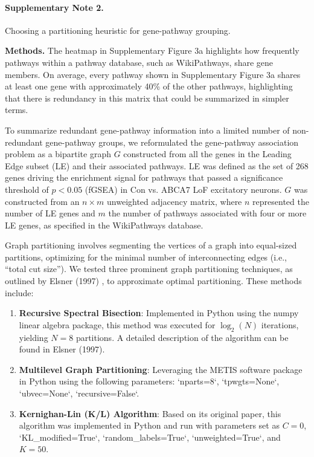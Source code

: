 \paragraph*{Supplementary Note 2.}
{}
Choosing a partitioning heuristic for gene-pathway grouping.

\textbf{Methods.}\newline
The heatmap in Supplementary Figure 3a highlights how frequently pathways within a pathway database, such as WikiPathways, share gene members. On average, every pathway shown in Supplementary Figure 3a shares at least one gene with approximately 40\% of the other pathways, highlighting that there is redundancy in this matrix that could be summarized in simpler terms.

To summarize redundant gene-pathway information into a limited number of non-redundant gene-pathway groups, we reformulated the gene-pathway association problem as a bipartite graph $G$ constructed from all the genes in the Leading Edge subset (LE) and their associated pathways. LE was defined as the set of 268 genes driving the enrichment signal for pathways that passed a significance threshold of $p < 0.05$ (fGSEA) in Con vs. ABCA7 LoF excitatory neurons. $G$ was constructed from an $n \times m$ unweighted adjacency matrix, where $n$ represented the number of LE genes and $m$ the number of pathways associated with four or more LE genes, as specified in the WikiPathways database.

Graph partitioning involves segmenting the vertices of a graph into equal-sized partitions, optimizing for the minimal number of interconnecting edges (i.e., “total cut size”). We tested three prominent graph partitioning techniques, as outlined by Elsner (1997) \supercite{Elsner1997GraphPartitioning}, to approximate optimal partitioning. These methods include:

\begin{enumerate}
    \item \textbf{Recursive Spectral Bisection}: Implemented in Python using the numpy linear algebra package, this method was executed for $\log_2(N)$ iterations, yielding $N = 8$ partitions. A detailed description of the algorithm can be found in Elsner (1997)\supercite{Elsner1997GraphPartitioning}.
    \item \textbf{Multilevel Graph Partitioning}: Leveraging the METIS software package \supercite{Karypis1997METIS} in Python using the following parameters: `nparts=8`, `tpwgts=None`, `ubvec=None`, `recursive=False`.
    \item \textbf{Kernighan-Lin (K/L) Algorithm}: Based on its original paper\supercite{Kernighan1970-zl}, this algorithm was implemented in Python and run with parameters set as $C=0$, `KL\_modified=True`, `random\_labels=True`, `unweighted=True`, and $K=50$.
\end{enumerate}


